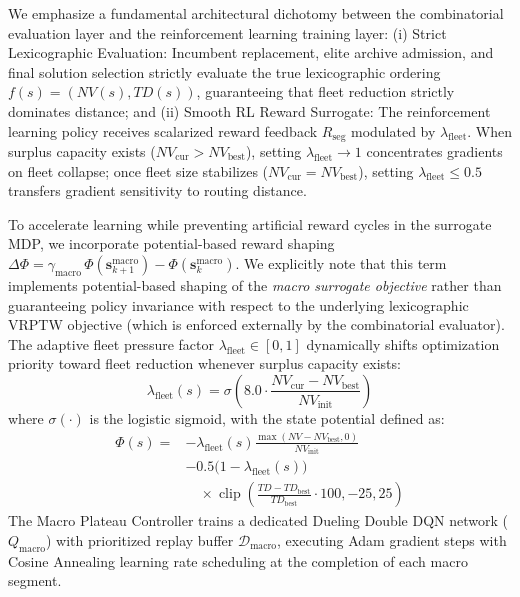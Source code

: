 \documentclass{ieeeaccess}
\begin{document}
We emphasize a fundamental architectural dichotomy between the combinatorial evaluation layer and the reinforcement learning training layer: (i) Strict Lexicographic Evaluation: Incumbent replacement, elite archive admission, and final solution selection strictly evaluate the true lexicographic ordering $f(s) = (NV(s), TD(s))$, guaranteeing that fleet reduction strictly dominates distance; and (ii) Smooth RL Reward Surrogate: The reinforcement learning policy receives scalarized reward feedback $R_{\text{seg}}$ modulated by $\lambda_{\text{fleet}}$. When surplus capacity exists ($NV_{\text{cur}} > NV_{\text{best}}$), setting $\lambda_{\text{fleet}} \to 1$ concentrates gradients on fleet collapse; once fleet size stabilizes ($NV_{\text{cur}} = NV_{\text{best}}$), setting $\lambda_{\text{fleet}} \le 0.5$ transfers gradient sensitivity to routing distance.

To accelerate learning while preventing artificial reward cycles in the surrogate MDP, we incorporate potential-based reward shaping $\Delta \Phi = \gamma_{\text{macro}}\,\Phi(\mathbf{s}_{k+1}^{\text{macro}}) - \Phi(\mathbf{s}_k^{\text{macro}})$. We explicitly note that this term implements potential-based shaping of the \emph{macro surrogate objective} \cite{ng1999policy} rather than guaranteeing policy invariance with respect to the underlying lexicographic VRPTW objective (which is enforced externally by the combinatorial evaluator). The adaptive fleet pressure factor $\lambda_{\text{fleet}} \in [0, 1]$ dynamically shifts optimization priority toward fleet reduction whenever surplus capacity exists:
\begin{equation}
  \lambda_{\text{fleet}}(s) = \sigma\!\left(8.0 \cdot \frac{NV_{\text{cur}} - NV_{\text{best}}}{NV_{\text{init}}}\right)
  \label{eq:lambda_fleet}
\end{equation}
where $\sigma(\cdot)$ is the logistic sigmoid, with the state potential defined as:
\begin{align}
  \Phi(s) = &-\lambda_{\text{fleet}}(s) \frac{\max(NV - NV_{\text{best}}, 0)}{NV_{\text{init}}} \nonumber \\
  &- 0.5\bigl(1 - \lambda_{\text{fleet}}(s)\bigr) \nonumber \\
  &\quad \times \operatorname{clip}\!\left(\frac{TD - TD_{\text{best}}}{TD_{\text{best}}} \cdot 100, -25, 25\right)
  \label{eq:potential_function}
\end{align}
The Macro Plateau Controller trains a dedicated Dueling Double DQN network ($Q_{\text{macro}}$) with prioritized replay buffer $\mathcal{D}_{\text{macro}}$, executing Adam gradient steps with Cosine Annealing learning rate scheduling at the completion of each macro segment.
\end{document}
